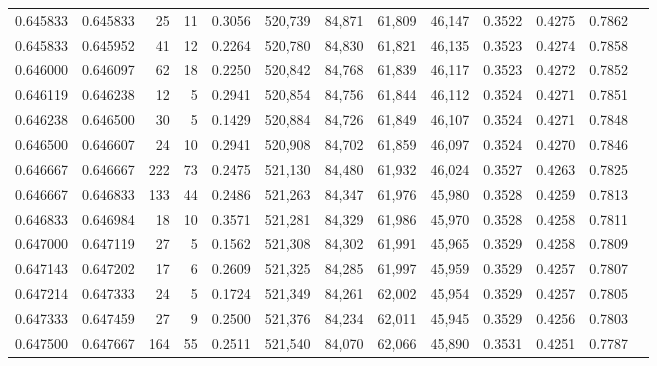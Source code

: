 \begin{tabular}{rrrrrrrrrrrrr}
0.645833 & 0.645833 &    25 &  11 &                                     0.3056 & 520,739 &  84,871 &  61,809 &  46,147 & 0.3522 & 0.4275 & 0.7862 \\
0.645833 & 0.645952 &    41 &  12 &                                     0.2264 & 520,780 &  84,830 &  61,821 &  46,135 & 0.3523 & 0.4274 & 0.7858 \\
0.646000 & 0.646097 &    62 &  18 &                                     0.2250 & 520,842 &  84,768 &  61,839 &  46,117 & 0.3523 & 0.4272 & 0.7852 \\
0.646119 & 0.646238 &    12 &   5 &                                     0.2941 & 520,854 &  84,756 &  61,844 &  46,112 & 0.3524 & 0.4271 & 0.7851 \\
0.646238 & 0.646500 &    30 &   5 &                                     0.1429 & 520,884 &  84,726 &  61,849 &  46,107 & 0.3524 & 0.4271 & 0.7848 \\
0.646500 & 0.646607 &    24 &  10 &                                     0.2941 & 520,908 &  84,702 &  61,859 &  46,097 & 0.3524 & 0.4270 & 0.7846 \\
0.646667 & 0.646667 &   222 &  73 &                                     0.2475 & 521,130 &  84,480 &  61,932 &  46,024 & 0.3527 & 0.4263 & 0.7825 \\
0.646667 & 0.646833 &   133 &  44 &                                     0.2486 & 521,263 &  84,347 &  61,976 &  45,980 & 0.3528 & 0.4259 & 0.7813 \\
0.646833 & 0.646984 &    18 &  10 &                                     0.3571 & 521,281 &  84,329 &  61,986 &  45,970 & 0.3528 & 0.4258 & 0.7811 \\
0.647000 & 0.647119 &    27 &   5 &                                     0.1562 & 521,308 &  84,302 &  61,991 &  45,965 & 0.3529 & 0.4258 & 0.7809 \\
0.647143 & 0.647202 &    17 &   6 &                                     0.2609 & 521,325 &  84,285 &  61,997 &  45,959 & 0.3529 & 0.4257 & 0.7807 \\
0.647214 & 0.647333 &    24 &   5 &                                     0.1724 & 521,349 &  84,261 &  62,002 &  45,954 & 0.3529 & 0.4257 & 0.7805 \\
0.647333 & 0.647459 &    27 &   9 &                                     0.2500 & 521,376 &  84,234 &  62,011 &  45,945 & 0.3529 & 0.4256 & 0.7803 \\
0.647500 & 0.647667 &   164 &  55 &                                     0.2511 & 521,540 &  84,070 &  62,066 &  45,890 & 0.3531 & 0.4251 & 0.7787 \\

\end{tabular}
